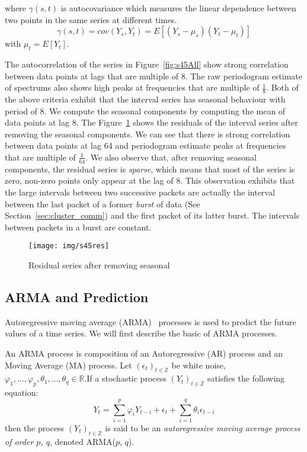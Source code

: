\documentclass[12pt]{article}
\begin{document}
where $\gamma(s,t)$ is autocovariance which measures the linear dependence
between two points in the same series at different times.
\begin{equation}
\gamma(s,t)=cov(Y_s, Y_t)=E[(Y_s-\mu_s)(Y_t-\mu_t)]
\end{equation}
with $\mu_t=E[Y_t]$.

The autocorrelation of the series in Figure~\ref{fig:s45All} show strong
correlation between data points at lags that are multiple of 8. The raw
periodogram estimate of spectrums also shows high peaks at frequencies that are
multiple of $\frac{1}{8}$. Both of the above criteria exhibit that the interval
series has seasonal behaviour with period of 8. We compute the seasonal
components by computing the mean of data points at lag 8. The
Figure~\ref{fig:s45res} shows the residuals of the interval series after
removing the seasonal components. We can see that there is strong correlation
between data points at lag 64 and periodogram estimate peaks at frequencies
that are multiple of $\frac{1}{64}$. We also observe that, after removing
seasonal components, the residual series is \textit{sparse}, which means that
most of the series is zero, non-zero points only appear at the lag of 8. This
observation exhibits that the large intervals between two successive packets are
actually the interval between the last packet of a former \textit{burst} of data
(See Section~\ref{sec:cluster_comm}) and the first packet of its latter burst.
The intervals between packets in a burst are constant.

\begin{figure}[ht!]
\centering
\texttt{[image: img/s45res]}
\caption{Residual series after removing seasonal}\label{fig:s45res}
\end{figure}

\subsection{ARMA and Prediction}
Autoregressive moving average (ARMA)~\cite{BoxTimeSeries, FalkStatSAS}
 processes is used to predict the future values of a time series. We will first
 describe the basic of ARMA processes.
 
 An ARMA process is composition of an Autoregressive (AR) process and an Moving
 Average (MA) process. Let $(\epsilon_t)_{t\in \mathbb{Z}}$ be white noise,
 $\varphi_1, \ldots, \varphi_p, \theta_1, \ldots, \theta_q\in\mathbb{R}$.If a
stochastic process $(Y_t)_{t\in \mathbb{Z}}$ satisfies the following
 equation:
 \begin{equation}\label{eqn:ARMA}
 Y_t=\sum_{i=1}^{p}\varphi_iY_{t-i}+
 \epsilon_t +\sum_{i=1}^{q}\theta_i\epsilon_{t-i}
 \end{equation}
then the process $(Y_t)_{t\in \mathbb{Z}}$ is said to be
an \textit{autoregressive moving average process of order $p$, $q$}, denoted
ARMA($p$, $q$).
\end{document}
